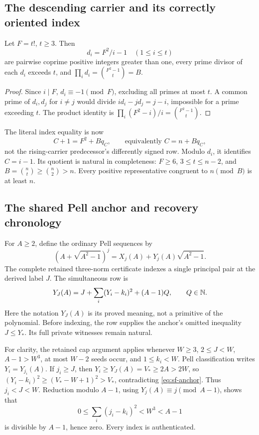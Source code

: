 \subsection{The descending carrier and its correctly oriented index}
\begin{lemma}\label{lem:sf-crt}
Let \(F=t!\), \(t\ge3\). Then
\[
 d_i=F^2/i-1\quad(1\le i\le t)
\]
are pairwise coprime positive integers greater than one, every prime divisor
of each \(d_i\) exceeds \(t\), and
\(\prod_i d_i=\binom{F^2-1}{t}=B\).
\end{lemma}
\begin{proof}
Since \(i\mid F\), \(d_i\equiv-1\pmod F\), excluding all primes at
most \(t\). A common prime of \(d_i,d_j\) for \(i\ne j\) would divide
\(id_i-jd_j=j-i\), impossible for a prime exceeding \(t\).
The product identity is
\(\prod_i(F^2-i)/i=\binom{F^2-1}{t}\).
\end{proof}
The literal index equality is now
\begin{equation}\label{eq:sf-index}
 C+1=F^2+Bq_C,\qquad\text{equivalently } C=n+Bq_C,
\end{equation}
not the rising-carrier predecessor's differently signed row.
Modulo \(d_i\), it identifies \(C=i-1\).
Its quotient is natural in completeness: \(F\ge6\),
\(3\le t\le n-2\), and
\(B=\binom nt\ge\binom n2>n\). Every positive representative
congruent to \(n\pmod B\) is at least \(n\).

\subsection{The shared Pell anchor and recovery chronology}
For \(A\ge2\), define the ordinary Pell sequences by
\[
 (A+\sqrt{A^2-1})^j=X_j(A)+Y_j(A)\sqrt{A^2-1}.
\]
The complete retained three-norm certificate indexes a single principal
pair at the derived label \(J\). The simultaneous row is
\begin{equation}\label{eq:sf-anchor}
 Y_J(A)=J+\sum_i(Y_i-k_i)^2+(A-1)Q,\qquad Q\in\mathbb N.
\end{equation}
Here the notation \(Y_J(A)\) is its proved meaning, not a primitive of
the polynomial. Before indexing, the row supplies the anchor's omitted
inequality \(J\le Y_*\). Its full private witnesses remain natural.

For clarity, the retained cap argument applies whenever
\(W\ge3\), \(2\le J<W\), \(A-1>W^3\), at most \(W-2\)
seeds occur, and \(1\le k_i<W\).
Pell classification writes \(Y_i=Y_{j_i}(A)\). If \(j_i\ge J\),
then \(Y_i\ge Y_J(A)=V_*\ge2A>2W\), so
\((Y_i-k_i)^2\ge(V_*-W+1)^2>V_*\), contradicting
\eqref{eq:sf-anchor}. Thus \(j_i<J<W\). Reduction modulo \(A-1\),
using \(Y_j(A)\equiv j\pmod{A-1}\), shows that
\[
 0\le\sum_i(j_i-k_i)^2<W^3<A-1
\]
is divisible by \(A-1\), hence zero. Every index is authenticated.

